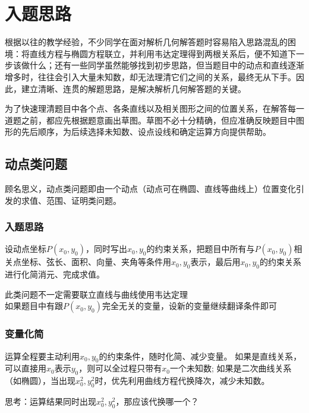 
\section{入题思路}
根据以往的教学经验，不少同学在面对解析几何解答题时容易陷入思路混乱的困境：将直线方程与椭圆方程联立，并利用韦达定理得到两根关系后，便不知道下一步该做什么；还有一些同学虽然能够找到初步思路，但当题目中的动点和直线逐渐增多时，往往会引入大量未知数，却无法理清它们之间的关系，最终无从下手。因此，建立清晰、连贯的解题思路，是解决解析几何解答题的关键。

为了快速理清题目中各个点、各条直线以及相关图形之间的位置关系，在解答每一道题之前，都应先根据题意画出草图。草图不必十分精确，但应准确反映题目中图形的先后顺序，为后续选择未知数、设点设线和确定运算方向提供帮助。
\subsection{动点类问题}
顾名思义，动点类问题即由一个动点（动点可在椭圆、直线等曲线上）位置变化引发的求值、范围、证明类问题。


\subsubsection*{入题思路}
设动点坐标$P(x_0, y_0)$，同时写出$x_0, y_0$的约束关系，把题目中所有与$P(x_0, y_0)$相关点坐标、弦长、面积、向量、夹角等条件用$x_0, y_0$表示，最后用$x_0, y_0$的约束关系进行化简消元、完成求值。

\begin{remark}
    此类问题不一定需要联立直线与曲线使用韦达定理 \\
    如果题目中有跟$P(x_0, y_0)$完全无关的变量，设新的变量继续翻译条件即可
\end{remark}

\subsubsection*{变量化简}
运算全程要主动利用$x_0, y_0$的约束条件，随时化简、减少变量。
如果是直线关系，可以直接用$x_0$表示$y_0$，则可以全过程只带有$x_0$一个未知数;
如果是二次曲线关系（如椭圆），当出现$x_0^2, y_0^2$时，优先利用曲线方程代换降次，减少未知数。

\begin{remark}
思考：运算结果同时出现$x_0^2, y_0^2$，那应该代换哪一个？
\end{remark}

